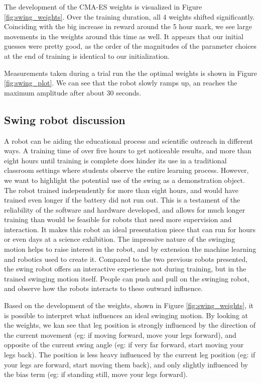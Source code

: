 \documentclass[11pt, a4paper]{article}
\begin{document}
	The development of the CMA-ES weights is visualized in Figure \ref{fig:swing_weights}. Over the training duration, all 4 weights shifted significantly. Coinciding with the big increase in reward around the 5 hour mark, we see large movements in the weights around this time as well. It appears that our initial guesses were pretty good, as the order of the magnitudes of the parameter choices at the end of training is identical to our initialization. 
	
	Measurements taken during a trial run the the optimal weights is shown in Figure \ref{fig:swing_plot}. We can see that the robot slowly ramps up, an reaches the maximum amplitude after about 30 seconds.
	
	
	\subsection{Swing robot discussion}
	A robot can be aiding the educational process and scientific outreach in different ways. A training time of over five hours to get noticeable results, and more than eight hours until training is complete does hinder its use in a traditional classroom settings where students observe the entire learning process. However, we want to highlight the potential use of the swing as a demonstration object. The robot trained independently for more than eight hours, and would have trained even longer if the battery did not run out. This is a testament of the reliability of the software and hardware developed, and allows for much longer training than would be feasible for robots that need more supervision and interaction. It makes this robot an ideal presentation piece that can run for hours or even days at a science exhibition. The impressive nature of the swinging motion helps to raise interest in the robot, and by extension the machine learning and robotics used to create it. Compared to the two previous robots presented, the swing robot offers an interactive experience not during training, but in the trained swinging motion itself. People can push and pull on the swinging robot, and observe how the robots interacts to these outward influence.
	
	\medskip
	
	Based on the development of the weights, shown in Figure \ref{fig:swing_weights}, it is possible to interpret what influences an ideal swinging motion. By looking at the weights, we kan see that leg position is strongly influenced by the direction of the current movement (eg: if moving forward, move your legs forward), and opposite of the current swing angle (eg: if very far forward, start moving your legs back). The position is less heavy influenced by the current leg position (eg: if your legs are forward, start moving them back), and only slightly influenced by the bias term (eg: if standing still, move your legs forward). 
	
\end{document}
